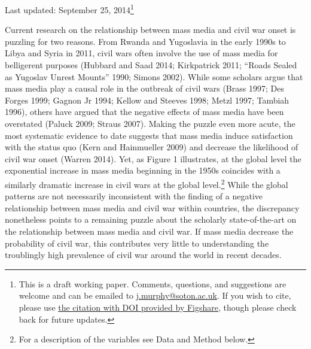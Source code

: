 \documentclass[11pt,article,oneside]{memoir}
\begin{document}
Last updated: September 25, 2014\footnote{This is a draft working paper.
  Comments, questions, and suggestions are welcome and can be emailed to
  \href{mailto:j.murphy@soton.ac.uk}{j.murphy@soton.ac.uk}. If you wish
  to cite, please use
  \href{http://figshare.com/authors/Justin_Murphy/498998}{the citation
  with DOI provided by Figshare}, though please check back for future
  updates.} \newline

\clearpage
{}

\onehalfspacing

Current research on the relationship between mass media and civil war
onset is puzzling for two reasons. From Rwanda and Yugoslavia in the
early 1990s to Libya and Syria in 2011, civil wars often involve the use
of mass media for belligerent purposes (Hubbard and Saad 2014;
Kirkpatrick 2011; ``Roads Sealed as Yugoslav Unrest Mounts'' 1990;
Simons 2002). While some scholars argue that mass media play a causal
role in the outbreak of civil wars (Brass 1997; Des Forges 1999; Gagnon
Jr 1994; Kellow and Steeves 1998; Metzl 1997; Tambiah 1996), others have
argued that the negative effects of mass media have been overstated
(Paluck 2009; Straus 2007). Making the puzzle even more acute, the most
systematic evidence to date suggests that mass media induce satisfaction
with the status quo (Kern and Hainmueller 2009) and decrease the
likelihood of civil war onset (Warren 2014). Yet, as Figure 1
illustrates, at the global level the exponential increase in mass media
beginning in the 1950s coincides with a similarly dramatic increase in
civil wars at the global level.\footnote{For a description of the
  variables see Data and Method below.} While the global patterns are
not necessarily inconsistent with the finding of a negative relationship
between mass media and civil war within countries, the discrepancy
nonetheless points to a remaining puzzle about the scholarly
state-of-the-art on the relationship between mass media and civil war.
If mass media decrease the probability of civil war, this contributes
very little to understanding the troublingly high prevalence of civil
war around the world in recent decades.
\end{document}
